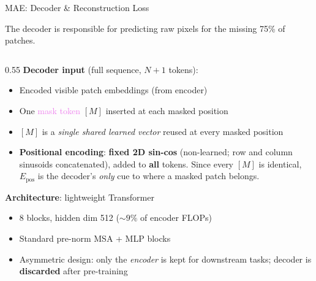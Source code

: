\begin{frame}{MAE: Decoder \& Reconstruction Loss}

  The decoder is responsible for predicting raw pixels for the missing 75\% of patches.

  \vspace{0.3em}
  \begin{columns}[T]
    \begin{column}{0.55\textwidth}
      \textbf{Decoder input} (full sequence, $N{+}1$ tokens):
      \begin{itemize}\itemsep0pt
        \item Encoded \textcolor{green!50!black}{visible patch} embeddings (from encoder)
        \item One \textcolor{violet}{mask token} $[M]$ inserted at each masked position
        \item $[M]$ is a \emph{single shared learned vector} reused at every masked position
        \item \textbf{Positional encoding}: \textbf{fixed 2D sin-cos} (non-learned; row and column sinusoids concatenated), added to \textbf{all} tokens. Since every $[M]$ is identical, $E_\text{pos}$ is the decoder's \emph{only} cue to where a masked patch belongs.
      \end{itemize}

      \vspace{0.3em}
      \textbf{Architecture}: lightweight Transformer
      \begin{itemize}\itemsep0pt
        \item 8 blocks, hidden dim 512 ($\sim 9\%$ of encoder FLOPs)
        \item Standard pre-norm MSA + MLP blocks
        \item Asymmetric design: only the \emph{encoder} is kept for downstream tasks; decoder is \textbf{discarded} after pre-training
      \end{itemize}


\end{column}
\end{columns}
\end{frame}
